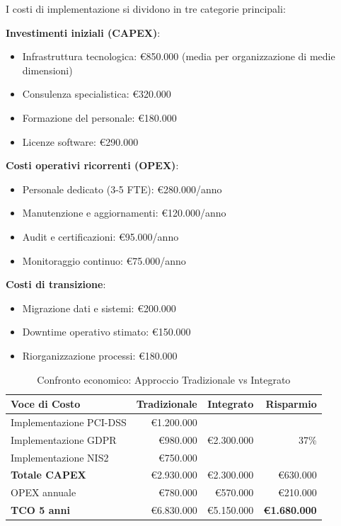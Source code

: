 I costi di implementazione si dividono in tre categorie principali:

\textbf{Investimenti iniziali (CAPEX)}:
\begin{itemize}
    \item Infrastruttura tecnologica: €850.000 (media per organizzazione di medie dimensioni)
    \item Consulenza specialistica: €320.000
    \item Formazione del personale: €180.000
    \item Licenze software: €290.000
\end{itemize}

\textbf{Costi operativi ricorrenti (OPEX)}:
\begin{itemize}
    \item Personale dedicato (3-5 FTE): €280.000/anno
    \item Manutenzione e aggiornamenti: €120.000/anno
    \item Audit e certificazioni: €95.000/anno
    \item Monitoraggio continuo: €75.000/anno
\end{itemize}

\textbf{Costi di transizione}:
\begin{itemize}
    \item Migrazione dati e sistemi: €200.000
    \item Downtime operativo stimato: €150.000
    \item Riorganizzazione processi: €180.000
\end{itemize}

\begin{table}[h]
\centering
\caption{Confronto economico: Approccio Tradizionale vs Integrato}
\label{tab:confronto_economico}
\begin{tabular}{|l|r|r|r|}
\hline
\textbf{Voce di Costo} & \textbf{Tradizionale} & \textbf{Integrato} & \textbf{Risparmio} \\
\hline
Implementazione PCI-DSS & €1.200.000 & \multirow{3}{*}{€2.300.000} & \multirow{3}{*}{37\%} \\
Implementazione GDPR & €980.000 & & \\
Implementazione NIS2 & €750.000 & & \\
\hline
\textbf{Totale CAPEX} & €2.930.000 & €2.300.000 & €630.000 \\
\hline
OPEX annuale & €780.000 & €570.000 & €210.000 \\
\hline
\textbf{TCO 5 anni} & €6.830.000 & €5.150.000 & \textbf{€1.680.000} \\
\hline
\end{tabular}
\end{table}

